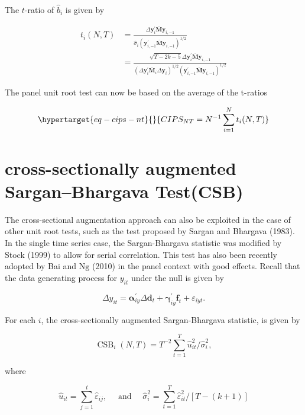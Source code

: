 \documentclass[
  12pt]{article}
\begin{document}
The \(t\)-ratio of \(\hat{b}_i\) is given by

\[
\begin{aligned}
t_i(N, T) &=\frac{\Delta \mathbf{y}_i^{\prime} \overline{\mathbf{M}} \mathbf{y}_{i,-1}}{\hat{\sigma}_i\left(\mathbf{y}_{i,-1}^{\prime} \overline{\mathbf{M}} \mathbf{y}_{i,-1}\right)^{1 / 2}} \\
&=\frac{\sqrt{T-2 k-5} \Delta \mathbf{y}_i^{\prime} \overline{\mathbf{M}} \mathbf{y}_{i,-1}}{\left(\Delta \mathbf{y}_i^{\prime} \overline{\mathbf{M}}_i \Delta \mathbf{y}_i\right)^{1 / 2}\left(\mathbf{y}_{i,-1}^{\prime} \overline{\mathbf{M}} \mathbf{y}_{i,-1}\right)^{1 / 2}}
\end{aligned}
\]

The panel unit root test can now be based on the average of the t-ratios

\begin{equation}\protect\hypertarget{eq-cips-nt}{}{
C I P S_{N T}=N^{-1} \sum_{i=1}^N t_i(N, T)
}\label{eq-cips-nt}\end{equation}

\hypertarget{cross-sectionally-augmented-sarganbhargava-testcsb}{%
\section{cross-sectionally augmented Sargan--Bhargava
Test(CSB)}\label{cross-sectionally-augmented-sarganbhargava-testcsb}}

The cross-sectional augmentation approach can also be exploited in the
case of other unit root tests, such as the test proposed by Sargan and
Bhargava (1983). In the single time series case, the Sargan-Bhargava
statistic was modified by Stock (1999) to allow for serial correlation.
This test has also been recently adopted by Bai and \(\mathrm{Ng}\)
(2010) in the panel context with good effects. Recall that the data
generating process for \(y_{i t}\) under the null is given by

\[
\Delta y_{i t}=\boldsymbol{\alpha}_{i y}^{\prime} \Delta \mathbf{d}_t+\boldsymbol{\gamma}_{i y}^{\prime} \mathbf{f}_t+\varepsilon_{i y t} .
\]

For each \(i\), the cross-sectionally augmented Sargan-Bhargava
statistic, is given by

\[
\operatorname{CSB}_i(N, T)=T^{-2} \sum_{t=1}^T \widehat{u}_{i t}^2 / \hat{\sigma}_i^2,
\]

where

\[
\widehat{u}_{i t}=\sum_{j=1}^t \hat{\varepsilon}_{i j}, \quad \text { and } \quad \hat{\sigma}_i^2=\sum_{t=1}^T \hat{\varepsilon}_{i t}^2 /[T-(k+1)]
\]
\end{document}
